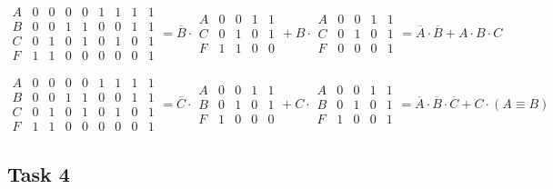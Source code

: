 \documentclass[a4paper,10pt]{article} %
\begin{document}
	\begin{equation}
		\begin{smallmatrix}
			A & 0 & 0 & 0 & 0 & 1 & 1 & 1 & 1 \\
			B & 0 & 0 & 1 & 1 & 0 & 0 & 1 & 1 \\
			C & 0 & 1 & 0 & 1 & 0 & 1 & 0 & 1 \\
			F & 1 & 1 & 0 & 0 & 0 & 0 & 0 & 1
		\end{smallmatrix}
		= \overline{B} \cdot
		\begin{smallmatrix}
			A & 0 & 0 & 1 & 1 \\
			C & 0 & 1 & 0 & 1 \\
			F & 1 & 1 & 0 & 0 
		\end{smallmatrix}
		+ B \cdot
		\begin{smallmatrix}
			A & 0 & 0 & 1 & 1 \\
			C & 0 & 1 & 0 & 1 \\
			F & 0 & 0 & 0 & 1
		\end{smallmatrix}
		= \overline{A} \cdot \overline{B} + A \cdot B \cdot C
	\end{equation}

	\begin{equation}
		\begin{smallmatrix}
			A & 0 & 0 & 0 & 0 & 1 & 1 & 1 & 1 \\
			B & 0 & 0 & 1 & 1 & 0 & 0 & 1 & 1 \\
			C & 0 & 1 & 0 & 1 & 0 & 1 & 0 & 1 \\
			F & 1 & 1 & 0 & 0 & 0 & 0 & 0 & 1
		\end{smallmatrix}
		= \overline{C} \cdot 
		\begin{smallmatrix}
			A & 0 & 0 & 1 & 1 \\
			B & 0 & 1 & 0 & 1 \\
			F & 1 & 0 & 0 & 0
		\end{smallmatrix}
		+ C \cdot
		\begin{smallmatrix}
			A & 0 & 0 & 1 & 1 \\
			B & 0 & 1 & 0 & 1 \\
			F & 1 & 0 & 0 & 1
		\end{smallmatrix}
		= \overline{A} \cdot \overline{B} \cdot \overline{C} + C \cdot (A \equiv B) 
	\end{equation}
	
	\subsection{Task 4}
	
\end{document}
